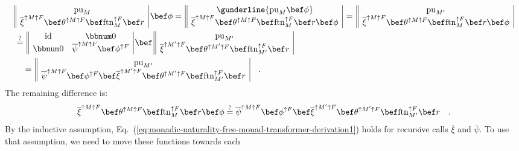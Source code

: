 \begin{align*}
 & \begin{array}{||c|}
\text{pu}_{M}\\
\overline{\xi}^{\uparrow M\uparrow F}\bef\theta^{\uparrow M\uparrow F}\bef\text{ftn}_{M}^{\uparrow F}\bef r
\end{array}\,\bef\phi=\,\begin{array}{||c|}
\gunderline{\text{pu}_{M}\bef\phi}\\
\overline{\xi}^{\uparrow M\uparrow F}\bef\theta^{\uparrow M\uparrow F}\bef\text{ftn}_{M}^{\uparrow F}\bef r\bef\phi
\end{array}\,=\,\begin{array}{||c|}
\text{pu}_{M^{\prime}}\\
\overline{\xi}^{\uparrow M\uparrow F}\bef\theta^{\uparrow M\uparrow F}\bef\text{ftn}_{M}^{\uparrow F}\bef r\bef\phi
\end{array}\\
 & \overset{?}{=}\,\begin{array}{||cc|}
\text{id} & \bbnum 0\\
\bbnum 0 & \overline{\psi}^{\uparrow M\uparrow F}\bef\phi^{\uparrow F}
\end{array}\,\bef\,\begin{array}{||c|}
\text{pu}_{M^{\prime}}\\
\overline{\xi}^{\uparrow M^{\prime}\uparrow F}\bef\theta^{\uparrow M^{\prime}\uparrow F}\bef\text{ftn}_{M^{\prime}}^{\uparrow F}\bef r
\end{array}\\
 & \quad=\,\begin{array}{||c|}
\text{pu}_{M^{\prime}}\\
\overline{\psi}^{\uparrow M\uparrow F}\bef\phi^{\uparrow F}\bef\overline{\xi}^{\uparrow M^{\prime}\uparrow F}\bef\theta^{\uparrow M^{\prime}\uparrow F}\bef\text{ftn}_{M^{\prime}}^{\uparrow F}\bef r
\end{array}\quad.
\end{align*}
The remaining difference is:
\[
\overline{\xi}^{\uparrow M\uparrow F}\bef\theta^{\uparrow M\uparrow F}\bef\text{ftn}_{M}^{\uparrow F}\bef r\bef\phi\overset{?}{=}\overline{\psi}^{\uparrow M\uparrow F}\bef\phi^{\uparrow F}\bef\overline{\xi}^{\uparrow M^{\prime}\uparrow F}\bef\theta^{\uparrow M^{\prime}\uparrow F}\bef\text{ftn}_{M^{\prime}}^{\uparrow F}\bef r\quad.
\]
By the inductive assumption, Eq.~(\ref{eq:monadic-naturality-free-monad-transformer-derivation1})
holds for recursive calls $\overline{\xi}$ and $\overline{\psi}$.
To use that assumption, we need to move these functions towards each
